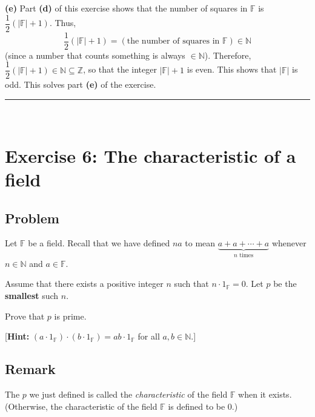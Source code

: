 \documentclass[paper=a4, fontsize=12pt]{scrartcl}%
\theoremstyle{plainsl}
\theoremstyle{definition}
\theoremstyle{remark}
\begin{document}
\bigskip

\textbf{(e)} Part \textbf{(d)} of this exercise shows that the number of
squares in $\mathbb{F}$ is $\dfrac{1}{2}\left(  \left\vert \mathbb{F}%
\right\vert +1\right)  $. Thus,%
\[
\dfrac{1}{2}\left(  \left\vert \mathbb{F}\right\vert +1\right)  =\left(
\text{the number of squares in }\mathbb{F}\right)  \in\mathbb{N}%
\]
(since a number that counts something is always $\in\mathbb{N}$). Therefore,
$\dfrac{1}{2}\left(  \left\vert \mathbb{F}\right\vert +1\right)  \in
\mathbb{N}\subseteq\mathbb{Z}$, so that the integer $\left\vert \mathbb{F}%
\right\vert +1$ is even. This shows that $\left\vert \mathbb{F}\right\vert $
is odd. This solves part \textbf{(e)} of the exercise.

\rule{\linewidth}{0.3pt} \\[0.4cm]

\section{Exercise 6: The characteristic of a field}

\subsection{Problem}

Let $\mathbb{F}$ be a field. Recall that we have defined $na$ to mean
$\underbrace{a + a + \cdots+ a}_{n \text{ times}}$ whenever $n \in\mathbb{N}$
and $a \in\mathbb{F}$.

Assume that there exists a positive integer $n$ such that $n \cdot
1_{\mathbb{F}} = 0$. Let $p$ be the \textbf{smallest} such $n$.

Prove that $p$ is prime.

[\textbf{Hint:} $\left(  a \cdot1_{\mathbb{F}} \right)  \cdot\left(  b
\cdot1_{\mathbb{F}} \right)  = ab \cdot1_{\mathbb{F}}$ for all $a, b
\in\mathbb{N}$.]

\subsection{Remark}

The $p$ we just defined is called the \textit{characteristic} of the field
$\mathbb{F}$ when it exists. (Otherwise, the characteristic of the field
$\mathbb{F}$ is defined to be $0$.)
\end{document}
